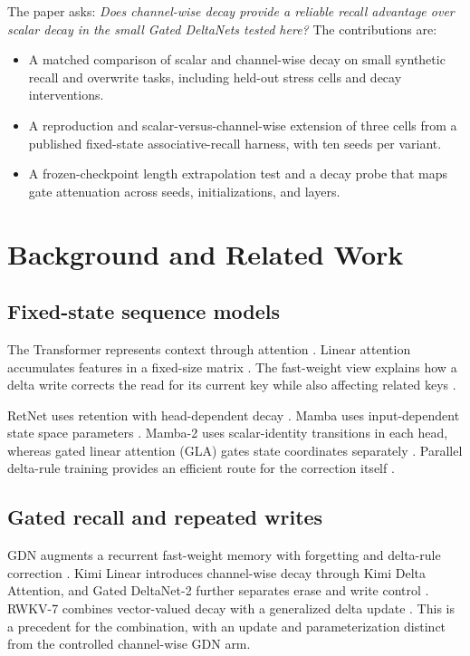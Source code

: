 \documentclass[conference]{IEEEtran}
\begin{document}
The paper asks: \emph{Does channel-wise decay provide a reliable recall advantage over scalar decay in the small Gated DeltaNets tested here?} The contributions are:
\begin{itemize}
  \item A matched comparison of scalar and channel-wise decay on small synthetic recall and overwrite tasks, including held-out stress cells and decay interventions.
  \item A reproduction and scalar-versus-channel-wise extension of three cells from a published fixed-state associative-recall harness, with ten seeds per variant.
  \item A frozen-checkpoint length extrapolation test and a decay probe that maps gate attenuation across seeds, initializations, and layers.
\end{itemize}

\section{Background and Related Work}
\subsection{Fixed-state sequence models}
The Transformer represents context through attention \cite{vaswani2017attention}. Linear attention accumulates features in a fixed-size matrix \cite{katharopoulos2020transformers}. The fast-weight view explains how a delta write corrects the read for its current key while also affecting related keys \cite{schlag2021linear}.

RetNet uses retention with head-dependent decay \cite{sun2023retnet}. Mamba uses input-dependent state space parameters \cite{gu2024mamba}. Mamba-2 uses scalar-identity transitions in each head, whereas gated linear attention (GLA) gates state coordinates separately \cite{dao2024transformers,yang2024gla}. Parallel delta-rule training provides an efficient route for the correction itself \cite{yang2024delta}.

\subsection{Gated recall and repeated writes}
GDN augments a recurrent fast-weight memory with forgetting and delta-rule correction \cite{yang2025gdn}. Kimi Linear introduces channel-wise decay through Kimi Delta Attention, and Gated DeltaNet-2 further separates erase and write control \cite{kimi2025,hatamizadeh2026gdn2}. RWKV-7 combines vector-valued decay with a generalized delta update \cite{peng2025rwkv}. This is a precedent for the combination, with an update and parameterization distinct from the controlled channel-wise GDN arm.
\end{document}
